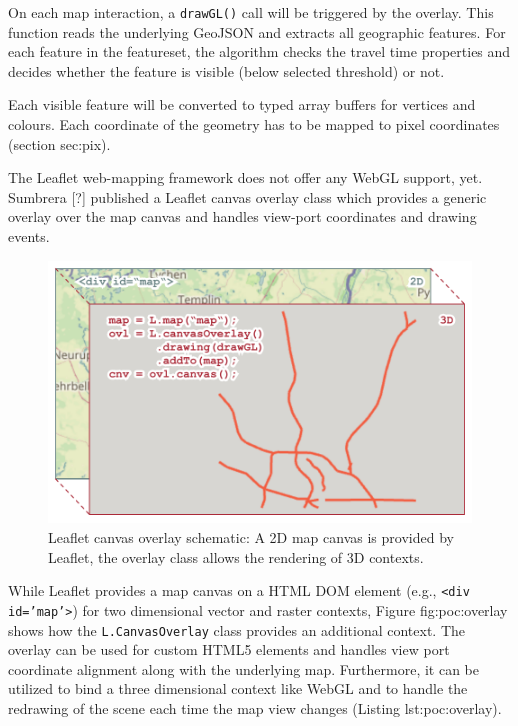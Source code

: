 
      On each map interaction, a \texttt{drawGL()} call will be triggered by the overlay. This function reads the underlying GeoJSON and extracts all geographic features. For each feature in the featureset, the algorithm checks the travel time properties and decides whether the feature is visible (below selected threshold) or not.\par
      Each visible feature will be converted to typed array buffers for vertices and colours. Each coordinate of the geometry has to be mapped to pixel coordinates (section {sec:pix}).\par
      The Leaflet web-mapping framework does not offer any WebGL support, yet. Sumbrera [?] published a Leaflet canvas overlay class which provides a generic overlay over the map canvas and handles view-port coordinates and drawing events.\par
      \begin{figure}[h]
        \centering
        \includegraphics[width=0.7\linewidth]{./img/leaflet-canvas-overlay.pdf}
        \caption{Leaflet canvas overlay schematic: A 2D map canvas is provided by Leaflet, the overlay class allows the rendering of 3D contexts.}
        \label{fig:poc:overlay}
      \end{figure}
      
      While Leaflet provides a map canvas on a HTML DOM element (e.g., \texttt{<div id='map'>}) for two dimensional vector and raster contexts, Figure {fig:poc:overlay} shows how the \texttt{L.CanvasOverlay} class provides an additional context. The overlay can be used for custom HTML5 elements and handles view port coordinate alignment along with the underlying map. Furthermore, it can be utilized to bind a three dimensional context like WebGL and to handle the redrawing of the scene each time the map view changes (Listing {lst:poc:overlay}).\par
